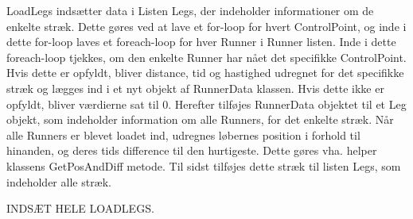 LoadLegs indsætter data i Listen Legs, der indeholder informationer om de enkelte stræk. Dette gøres ved at lave et for-loop for hvert ControlPoint, og inde i dette for-loop laves et foreach-loop for hver Runner i Runner listen. Inde i dette foreach-loop tjekkes, om den enkelte Runner har nået det specifikke ControlPoint. Hvis dette er opfyldt, bliver distance, tid og hastighed udregnet for det specifikke stræk og lægges ind i et nyt objekt af RunnerData klassen. Hvis dette ikke er opfyldt, bliver værdierne sat til 0. Herefter tilføjes RunnerData objektet til et Leg objekt, som indeholder information om alle Runners, for det enkelte stræk. Når alle Runners er blevet loadet ind, udregnes løbernes position i forhold til hinanden, og deres tids difference til den hurtigeste. Dette gøres vha. helper klassens GetPosAndDiff metode. Til sidst tilføjes dette stræk til listen Legs, som indeholder alle stræk. 

INDSÆT HELE LOADLEGS.
